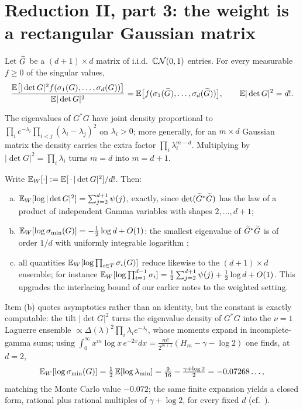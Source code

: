 \section{Reduction II, part 3: the weight is a rectangular Gaussian matrix}\label{sec:weight}

\begin{lemma}\label{lem:rectangular}
  Let $\widetilde G$ be a $(d+1)\times d$ matrix of i.i.d.\ $\mathbb{C}\mathcal{N}(0,1)$ entries. For every
  measurable $f\ge0$ of the singular values,
  \[
    \frac{\mathbb{E}\bigl[|\det G|^2 f(\sigma_1(G),\dots,\sigma_d(G))\bigr]}{\mathbb{E}|\det G|^2}
    = \mathbb{E}\bigl[f(\sigma_1(\widetilde G),\dots,\sigma_d(\widetilde G))\bigr],
    \qquad \mathbb{E}|\det G|^2 = d!.
  \]
\end{lemma}

\proof
The eigenvalues of $G^*G$ have joint density proportional to
$\prod_ie^{-\lambda_i}\prod_{i<j}(\lambda_i-\lambda_j)^2$ on $\lambda_i>0$; more generally,
for an $m\times d$ Gaussian matrix the density carries the extra factor
$\prod_i\lambda_i^{m-d}$. Multiplying by $|\det G|^2 = \prod_i\lambda_i$ turns $m=d$ into
$m=d+1$.
\endproof

\begin{corollary}\label{cor:weighted}
  Write $\mathbb{E}_{W}[\cdot] := \mathbb{E}[\,\cdot\,|\det G|^2]/d!$. Then:
  \begin{enumerate}[(a)]
    \item $\mathbb{E}_{W}[\log|\det G|^2] = \sum_{j=2}^{d+1}\psi(j)$, exactly, since
      $\det(\widetilde G^*\widetilde G)$ has the law of a product of independent Gamma variables with
      shapes $2,\dots,d+1$;
    \item $\mathbb{E}_{W}[\log\sigma_{\min}(G)] = -\frac12\log d + O(1)$: the smallest eigenvalue of
      $\widetilde G^*\widetilde G$ is of order $1/d$ with uniformly integrable logarithm
      \cite{edelman1988eigenvalues,forrester2010log};
    \item all quantities $\mathbb{E}_{W}[\log\prod_{i\in T}\sigma_i(G)]$ reduce likewise to the
      $(d+1)\times d$ ensemble; for instance
      $\mathbb{E}_{W}[\log\prod_{i=1}^{d-1}\sigma_i]
      = \frac12\sum_{j=2}^{d+1}\psi(j) + \frac12\log d + O(1)$. This upgrades the
      interlacing bound of our earlier notes to the weighted setting.
  \end{enumerate}
\end{corollary}

Item (b) quotes asymptotics rather than an identity, but the constant is exactly computable:
the tilt $|\det G|^2$ turns the eigenvalue density of $G^*G$ into the $\nu=1$ Laguerre
ensemble $\propto\Delta(\lambda)^2\prod_i\lambda_ie^{-\lambda_i}$, whose moments expand in
incomplete-gamma sums; using
$\int_0^\infty x^m\log x\,e^{-2x}dx = \frac{m!}{2^{m+1}}(H_m-\gamma-\log2)$ one finds, at
$d=2$,
\[
  \mathbb{E}_{W}[\log\sigma_{\min}(G)] = \tfrac12\,\mathbb{E}[\log\lambda_{\min}]
  = \tfrac9{16} - \tfrac{\gamma+\log2}2 = -0.07268\dots,
\]
matching the Monte Carlo value $-0.072$; the same finite expansion yields a closed form,
rational plus rational multiples of $\gamma+\log2$, for every fixed $d$
(cf.~\cite{forrester2010log}).
